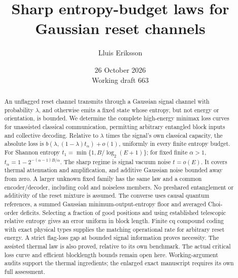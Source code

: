 \documentclass[11pt]{article}
\title{Sharp entropy-budget laws for Gaussian reset channels}
\author{Lluis Eriksson}
\date{26 October 2026\\\small Working draft 663}
\begin{document}
\maketitle
\begin{abstract}
An unflagged reset channel transmits through a Gaussian signal channel
with probability \(\lambda\), and otherwise emits a fixed state whose
entropy, but not energy or orientation, is bounded. We determine the
complete high-energy minimax loss curves for unassisted classical
communication, permitting arbitrary entangled block inputs and collective
decoding. Relative to \(\lambda\) times the signal's own classical
capacity, the absolute loss is
\(b(\lambda,(1-\lambda)t_\alpha)+o(1)\), uniformly in every finite entropy
budget. For Shannon entropy
\(t_1=\min\{1,B/\log_2(E+1)\}\); for fixed finite \(\alpha>1\),
\(t_\alpha=1-2^{-(\alpha-1)B/\alpha}\).
The sharp regime is signal vacuum noise \(t=o(E)\).
It covers thermal attenuation and amplification, and additive Gaussian
noise bounded away from zero. A larger unknown fixed family has the
same law and a common encoder/decoder, including cold and noiseless
members. No preshared entanglement or additivity of the reset mixture
is assumed. The converse uses causal quantum references, a summed
Gaussian minimum-output-entropy floor and averaged Choi-order deficits.
Selecting a fraction of good positions and using established telescopic
relative entropy gives an error uniform in block length.
Finite cq compound coding with exact physical types supplies the
matching operational rate for arbitrary reset energy. A strict flag-loss
gap at bounded signal information proves necessity.
The assisted thermal law is also proved, relative to its own benchmark.
The actual critical loss curve and efficient blocklength bounds remain
open here. Working-argument audits support the thermal ingredients;
the enlarged exact manuscript requires its own full assessment.
\end{abstract}
\end{document}
